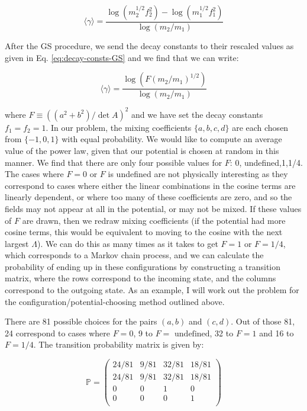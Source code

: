 \documentclass[11pt]{article}
\begin{document}
\begin{equation}
    \label{eq:power-law}
    \langle \gamma \rangle = \frac{\log{(m_2^{1/2}f_2^2)}-\log{(m_1^{1/2}f_1^2)}}{\log{(m_2/m_1)}}
\end{equation}

After the GS procedure, we send the decay constants to their rescaled values as given in Eq. \eqref{eq:decay-consts-GS} and we find that we can write:

\begin{equation}
    \label{eq:GS-exp-gamma}
    \langle \gamma \rangle = \frac{\log{(F(m_2/m_1)^{1/2})}}{\log{(m_2/m_1)}}
\end{equation}
 
\noindent where $F \equiv ((a^2+b^2)/\det{A})^2$ and we have set the decay constants $f_1=f_2=1$. In our problem, the mixing coefficients $\{a,b,c,d\}$ are each chosen from $\{-1,0,1\}$ with equal probability. We would like to compute an average value of the power law, given that our potential is chosen at random in this manner. We find that there are only four possible values for $F$: 0, undefined,1,1/4. The cases where $F=0$ or $F$ is undefined are not physically interesting as they correspond to cases where either the linear combinations in the cosine terms are linearly dependent, or where too many of these coefficients are zero, and so the fields may not appear at all in the potential, or may not be mixed. If these values of $F$ are drawn, then we redraw mixing coefficients (if the potential had more cosine terms, this would be equivalent to moving to the cosine with the next largest $\Lambda$). We can do this as many times as it takes to get $F=1$ or $F=1/4$, which corresponds to a Markov chain process, and we can calculate the probability of ending up in these configurations by constructing a transition matrix, where the rows correspond to the incoming state, and the columns correspond to the outgoing state. As an example, I will work out the problem for the configuration/potential-choosing method outlined above. 

There are 81 possible choices for the pairs $(a,b)$ and $(c,d)$. Out of those 81, 24 correspond to cases where $F=0$, 9 to $F= \text{ undefined}$, 32 to $F=1$ and 16 to $F=1/4$. The transition probability matrix is given by:

\begin{equation}
\mathbb{P}=
    \begin{pmatrix}
        24/81 & 9/81 & 32/81 & 18/81 \\
        24/81 & 9/81 & 32/81 & 18/81 \\
        0 & 0 & 1 & 0 \\
        0 & 0 & 0 & 1 \\
    \end{pmatrix}
\end{equation}
\end{document}
